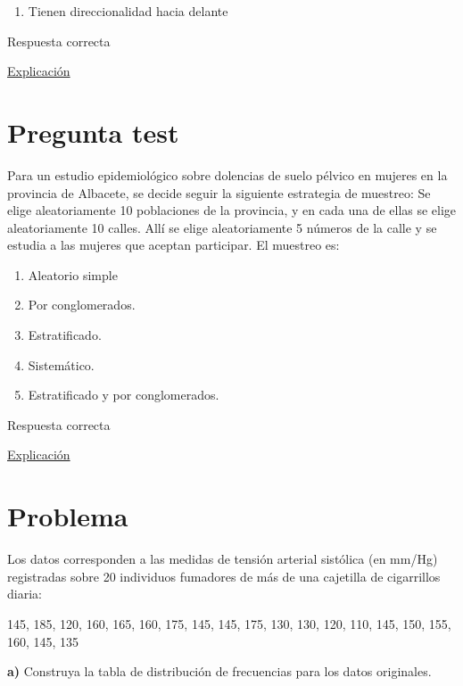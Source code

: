 \documentclass[
]{book}
\providecommand{\tightlist}{%
  \setlength{\itemsep}{0pt}\setlength{\parskip}{0pt}}
\begin{document}
\begin{enumerate}
\def\labelenumi{\arabic{enumi})}
\setcounter{enumi}{4}
\tightlist
\item
  Tienen direccionalidad hacia delante
\end{enumerate}

Respuesta correcta

\href{https://es.wikipedia.org/wiki/Estudio_de_cohorte}{Explicación}

\hypertarget{pregunta-test-24}{%
\section{Pregunta test}\label{pregunta-test-24}}

Para un estudio epidemiológico sobre dolencias de suelo pélvico en mujeres en la provincia de Albacete, se decide seguir la siguiente estrategia de muestreo: Se elige aleatoriamente 10 poblaciones de la provincia, y en cada una de ellas se elige aleatoriamente 10 calles. Allí se elige aleatoriamente 5 números de la calle y se estudia a las mujeres que aceptan participar. El muestreo es:

\begin{enumerate}
\def\labelenumi{\alph{enumi})}
\tightlist
\item
  Aleatorio simple
\item
  Por conglomerados.
\item
  Estratificado.
\item
  Sistemático.
\item
  Estratificado y por conglomerados.
\end{enumerate}

Respuesta correcta

\href{https://1fjmanzano.github.io/bioestadistica/me\%CC\%81todos-de-muestreo.html}{Explicación}

\hypertarget{problema-5}{%
\section{Problema}\label{problema-5}}

Los datos corresponden a las medidas de tensión arterial sistólica (en mm/Hg) registradas sobre 20 individuos fumadores de más de una cajetilla de cigarrillos diaria:

145, 185, 120, 160, 165, 160, 175, 145, 145, 175, 130, 130, 120, 110, 145, 150, 155, 160, 145, 135

\textbf{a)} Construya la tabla de distribución de frecuencias para los datos originales.
\end{document}
